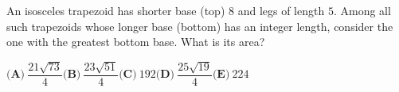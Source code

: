 An isosceles trapezoid has shorter base (top) $8$ and legs of length $5$. Among all such trapezoids whose longer base (bottom) has an integer length, consider the one with the greatest bottom base. What is its area?

$\textbf{(A)}\ \dfrac{21\sqrt{73}}{4}$\qquad$\textbf{(B)}\ \dfrac{23\sqrt{51}}{4}$\qquad$\textbf{(C)}\ 192$\qquad$\textbf{(D)}\ \dfrac{25\sqrt{19}}{4}$\qquad$\textbf{(E)}\ 224$
